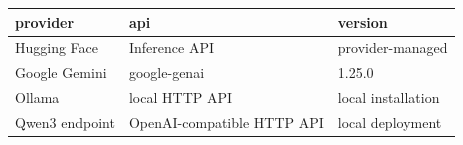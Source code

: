 \begin{tabular}{lll}
\toprule
provider & api & version \\
\midrule
Hugging Face & Inference API & provider-managed \\
Google Gemini & google-genai & 1.25.0 \\
Ollama & local HTTP API & local installation \\
Qwen3 endpoint & OpenAI-compatible HTTP API & local deployment \\
\bottomrule
\end{tabular}
